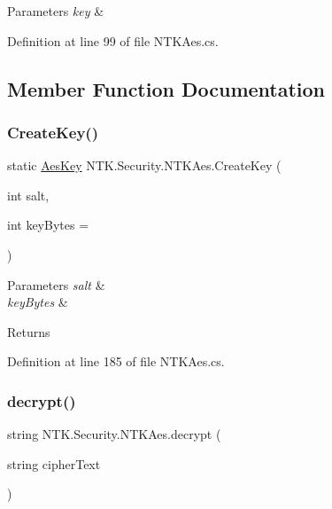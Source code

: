 \begin{DoxyParams}{Parameters}
{\em key} & \\
\hline
\end{DoxyParams}


Definition at line 99 of file N\+T\+K\+Aes.\+cs.



\subsection{Member Function Documentation}
\mbox{\label{class_n_t_k_1_1_security_1_1_n_t_k_aes_aa591423c332f2eb8eafe70621cb74eec}} 
\subsubsection{\texorpdfstring{CreateKey()}{CreateKey()}}
{\footnotesize\ttfamily static \mbox{\hyperlink{struct_n_t_k_1_1_security_1_1_aes_key}{Aes\+Key}} N\+T\+K.\+Security.\+N\+T\+K\+Aes.\+Create\+Key (\begin{DoxyParamCaption}\item[{int}]{salt,  }\item[{int}]{key\+Bytes = {} }\end{DoxyParamCaption})\hspace{0.3cm}{\ttfamily [static]}}






\begin{DoxyParams}{Parameters}
{\em salt} & \\
\hline
{\em key\+Bytes} & \\
\hline
\end{DoxyParams}
\begin{DoxyReturn}{Returns}

\end{DoxyReturn}


Definition at line 185 of file N\+T\+K\+Aes.\+cs.

\mbox{\label{class_n_t_k_1_1_security_1_1_n_t_k_aes_a4f70eed096e2d3e59c4a848f66289371}} 
\subsubsection{\texorpdfstring{decrypt()}{decrypt()}\hspace{0.1cm}{\footnotesize\ttfamily [1/2]}}
{\footnotesize\ttfamily string N\+T\+K.\+Security.\+N\+T\+K\+Aes.\+decrypt (\begin{DoxyParamCaption}\item[{string}]{cipher\+Text }\end{DoxyParamCaption})}







